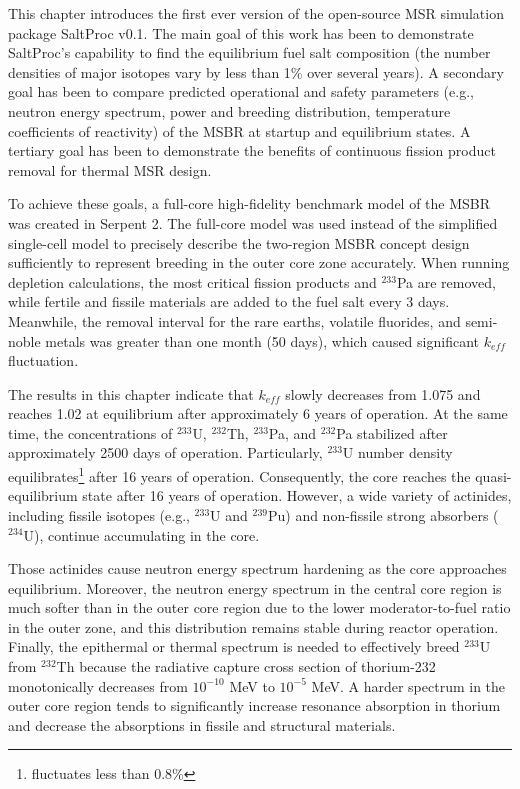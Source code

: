 This chapter introduces the first ever version of the open-source \gls{MSR} 
simulation package SaltProc v0.1. The main goal of this work has been to 
demonstrate SaltProc's capability to find the equilibrium fuel salt 
composition (the number densities of major isotopes vary by less than 1\% over 
several years). A secondary goal has been to compare predicted operational and 
safety parameters (e.g., neutron energy spectrum, power and breeding 
distribution, temperature coefficients of reactivity) of the \gls{MSBR} at 
startup and equilibrium states. A tertiary goal has been to demonstrate the 
benefits of continuous fission product removal for thermal \gls{MSR} design.

To achieve these goals, a full-core high-fidelity benchmark model of the 
\gls{MSBR} was created in Serpent 2. The full-core model was used instead of 
the simplified single-cell model \cite{betzler_molten_2017, 	
rykhlevskii_online_2017, betzler_fuel_2018} to precisely describe the 
two-region \gls{MSBR} concept design sufficiently to represent breeding in the 
outer core zone accurately. When running depletion calculations, the most 
critical fission products and $^{233}$Pa are removed, while fertile and  
fissile materials are added to the fuel salt every 3 days.  Meanwhile, the 
removal interval for the rare earths, volatile fluorides, and semi-noble 
metals was greater than one month (50 days), which caused significant 
$k_{eff}$  
fluctuation. 

The results in this chapter indicate that $k_{eff}$ slowly decreases from 
1.075 and reaches 1.02 at equilibrium after approximately 6 years of 
operation. At the same time, the concentrations of $^{233}$U, $^{232}$Th, 
$^{233}$Pa, and $^{232}$Pa stabilized after approximately 2500 days of 
operation. Particularly, $^{233}$U number density 
equilibrates\footnote{fluctuates less than 0.8\%} after 16 years of operation. 
Consequently, the core reaches the quasi-equilibrium state after 16 years of 
operation. However, a wide variety of actinides, including fissile isotopes 
(e.g., $^{233}$U and $^{239}$Pu) and non-fissile strong absorbers ($^{234}$U), 
continue accumulating in the core. 

Those actinides cause neutron energy spectrum hardening as the core  
approaches equilibrium. Moreover, the neutron energy spectrum in the central 
core region is much softer than in the outer core region due to the lower 
moderator-to-fuel ratio in the outer zone, and this distribution remains 
stable during reactor operation. Finally, the epithermal or thermal spectrum 
is needed to effectively breed $^{233}$U from $^{232}$Th because the radiative 
capture cross section of thorium-232 monotonically decreases from $10^{-10}$ 
MeV to $10^{-5}$ MeV. A harder spectrum in the outer core region tends to 
significantly increase resonance absorption in thorium and decrease the 
absorptions in fissile and structural materials. 

